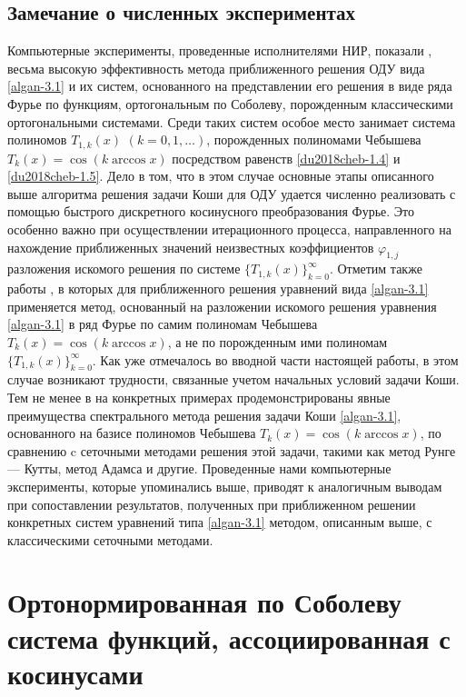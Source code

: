 \section{Замечание о численных экспериментах}
Компьютерные эксперименты, проведенные исполнителями НИР, показали \cite{MMG2016}, \cite{du2018cheb-SHII-MMG2018}  весьма высокую эффективность метода приближенного решения ОДУ вида \eqref{algan-3.1} и их систем, основанного на представлении его решения в виде ряда Фурье по функциям, ортогональным по Соболеву, порожденным классическими ортогональными системами. Среди таких систем особое место занимает система полиномов $T_{1,k}(x)$ $(k=0,1,\ldots)$, порожденных полиномами Чебышева   $T_k(x)=\cos(k\arccos x)$ посредством равенств \eqref{du2018cheb-1.4} и \eqref{du2018cheb-1.5}. Дело в том, что в этом случае основные этапы описанного выше алгоритма решения задачи Коши для ОДУ удается численно реализовать с помощью быстрого дискретного косинусного преобразования Фурье. Это особенно важно при осуществлении итерационного процесса, направленного на нахождение приближенных значений неизвестных коэффициентов $\varphi_{1,j}$ разложения искомого решения по системе $\{T_{1,k}(x)\}_{k=0}^\infty$. Отметим также работы
\cite{du2018cheb-Arush2010, du2018cheb-Arush2013, du2018cheb-Arush2014}, в которых для приближенного решения уравнений вида \eqref{algan-3.1} применяется  метод, основанный на разложении искомого решения уравнения \eqref{algan-3.1} в ряд Фурье по самим полиномам Чебышева
$T_k(x)=\cos(k\arccos x)$, а не по порожденным ими полиномам $\{T_{1,k}(x)\}_{k=0}^\infty$. Как уже отмечалось во вводной части настоящей работы, в этом случае возникают трудности, связанные учетом начальных условий задачи Коши. Тем не менее в \cite{du2018cheb-Arush2010, du2018cheb-Arush2013, du2018cheb-Arush2014} на конкретных примерах продемонстрированы явные преимущества спектрального метода решения задачи Коши \eqref{algan-3.1}, основанного на базисе полиномов Чебышева $T_k(x)=\cos(k\arccos x)$, по сравнению c сеточными методами решения этой задачи, такими как метод Рунге --- Кутты, метод Адамса и другие. Проведенные нами компьютерные эксперименты, которые упоминались выше, приводят к аналогичным выводам при сопоставлении результатов, полученных при приближенном  решении конкретных систем уравнений типа \eqref{algan-3.1} методом, описанным выше, с классическими сеточными методами.




\chapter{Ортонормированная по Соболеву система функций, ассоциированная с косинусами}

